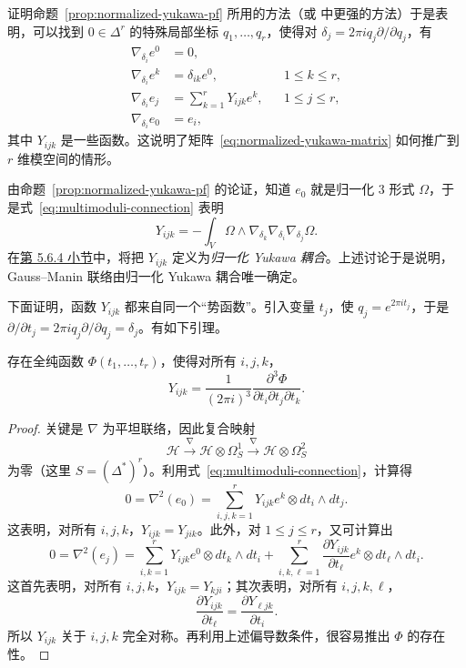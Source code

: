 证明命题~\ref{prop:normalized-yukawa-pf} 所用的方法（或  中更强的方法）于是表明，可以找到 $0\in\Delta^r$ 的特殊局部坐标 $q_1,\ldots,q_r$，使得对 $\delta_j=2\pi i q_j\partial/\partial q_j$，有
\begin{equation}\label{eq:multimoduli-connection}
\begin{aligned}
\nabla_{\delta_i}e^0&=0,\\
\nabla_{\delta_i}e^k&=\delta_{ik}e^0,&&1\leq k\leq r,\\
\nabla_{\delta_i}e_j&=\sum_{k=1}^rY_{ijk}e^k,&&1\leq j\leq r,\\
\nabla_{\delta_i}e_0&=e_i,
\end{aligned}
\end{equation}
其中 $Y_{ijk}$ 是一些函数。这说明了矩阵~\eqref{eq:normalized-yukawa-matrix} 如何推广到 $r$ 维模空间的情形。

由命题~\ref{prop:normalized-yukawa-pf} 的论证，知道 $e_0$ 就是归一化 $3$ 形式 $\Omega$，于是式~\eqref{eq:multimoduli-connection} 表明
\begin{equation}\label{eq:multimoduli-yukawa}
Y_{ijk}=-\int_V\Omega\wedge\nabla_{\delta_k}\nabla_{\delta_i}\nabla_{\delta_j}\Omega.
\end{equation}
在\hyperref[subsec:normalized-yukawa-mirror]{第 5.6.4 小节}中，将把 $Y_{ijk}$ 定义为\emph{归一化 Yukawa 耦合}。上述讨论于是说明，Gauss--Manin 联络由归一化 Yukawa 耦合唯一确定。

下面证明，函数 $Y_{ijk}$ 都来自同一个“势函数”。引入变量 $t_j$，使 $q_j=e^{2\pi i t_j}$，于是 $\partial/\partial t_j=2\pi i q_j\partial/\partial q_j=\delta_j$。有如下引理。
\begin{lemma}\label{lem:yukawa-potential}
存在全纯函数 $\Phi(t_1,\ldots,t_r)$，使得对所有 $i,j,k$，
\[
Y_{ijk}=\frac{1}{(2\pi i)^3}\frac{\partial^3\Phi}{\partial t_i\partial t_j\partial t_k}.
\]
\end{lemma}
\begin{proof}
关键是 $\nabla$ 为平坦联络，因此复合映射
\[
\mathcal H\xrightarrow{\nabla}\mathcal H\otimes\Omega_S^1
\xrightarrow{\nabla}\mathcal H\otimes\Omega_S^2
\]
为零（这里 $S=(\Delta^*)^r$）。利用式~\eqref{eq:multimoduli-connection}，计算得
\[
0=\nabla^2(e_0)=\sum_{i,j,k=1}^rY_{ijk}e^k\otimes dt_i\wedge dt_j.
\]
这表明，对所有 $i,j,k$，$Y_{ijk}=Y_{jik}$。此外，对 $1\leq j\leq r$，又可计算出
\[
0=\nabla^2(e_j)=\sum_{i,k=1}^rY_{ijk}e^0\otimes dt_k\wedge dt_i
+\sum_{i,k,\ell=1}^r\frac{\partial Y_{ijk}}{\partial t_\ell}e^k\otimes dt_\ell\wedge dt_i.
\]
这首先表明，对所有 $i,j,k$，$Y_{ijk}=Y_{kji}$；其次表明，对所有 $i,j,k,\ell$，
\[
\frac{\partial Y_{ijk}}{\partial t_\ell}
=\frac{\partial Y_{\ell jk}}{\partial t_i}.
\]
所以 $Y_{ijk}$ 关于 $i,j,k$ 完全对称。再利用上述偏导数条件，很容易推出 $\Phi$ 的存在性。
\end{proof}

